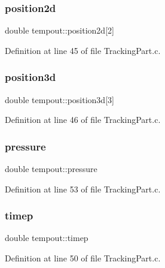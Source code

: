 \subsubsection{\texorpdfstring{position2d}{position2d}}
{\footnotesize\ttfamily double tempout\+::position2d\mbox{[}2\mbox{]}}



Definition at line 45 of file Tracking\+Part.\+c.

\mbox{\label{structtempout_a389fe2c017890281652d5abc6a608f91}} 
\subsubsection{\texorpdfstring{position3d}{position3d}}
{\footnotesize\ttfamily double tempout\+::position3d\mbox{[}3\mbox{]}}



Definition at line 46 of file Tracking\+Part.\+c.

\mbox{\label{structtempout_aac9d83b4e041609a40d2f5c2cf1d1bb5}} 
\subsubsection{\texorpdfstring{pressure}{pressure}}
{\footnotesize\ttfamily double tempout\+::pressure}



Definition at line 53 of file Tracking\+Part.\+c.

\mbox{\label{structtempout_af198ba0015680ea5c222caca83cc4d7a}} 
\subsubsection{\texorpdfstring{timep}{timep}}
{\footnotesize\ttfamily double tempout\+::timep}



Definition at line 50 of file Tracking\+Part.\+c.

\mbox{\label{structtempout_a7f6e4c17b4f10a6d9bbdbf02f794217f}} 
